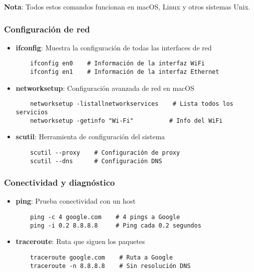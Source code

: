 \begin{itemize}
\begin{tcolorbox}[colback=blue!5!white,colframe=blue!60!gray,title=Comandos básicos]
\textbf{Nota}: Todos estos comandos funcionan en macOS, Linux y otros sistemas Unix.
\end{tcolorbox}

\subsubsection{Configuración de red}

\begin{itemize}
    \item \textbf{ifconfig}: Muestra la configuración de todas las interfaces de red
    \begin{verbatim}
    ifconfig en0    # Información de la interfaz WiFi
    ifconfig en1    # Información de la interfaz Ethernet
    \end{verbatim}
    
    \item \textbf{networksetup}: Configuración avanzada de red en macOS
    \begin{verbatim}
    networksetup -listallnetworkservices    # Lista todos los servicios
    networksetup -getinfo "Wi-Fi"          # Info del WiFi
    \end{verbatim}
    
    \item \textbf{scutil}: Herramienta de configuración del sistema
    \begin{verbatim}
    scutil --proxy    # Configuración de proxy
    scutil --dns      # Configuración DNS
    \end{verbatim}
\end{itemize}

\subsubsection{Conectividad y diagnóstico}

\begin{itemize}
    \item \textbf{ping}: Prueba conectividad con un host
    \begin{verbatim}
    ping -c 4 google.com    # 4 pings a Google
    ping -i 0.2 8.8.8.8     # Ping cada 0.2 segundos
    \end{verbatim}
    
    \item \textbf{traceroute}: Ruta que siguen los paquetes
    \begin{verbatim}
    traceroute google.com    # Ruta a Google
    traceroute -n 8.8.8.8    # Sin resolución DNS
    \end{verbatim}
    

\end{itemize}
\end{itemize}
